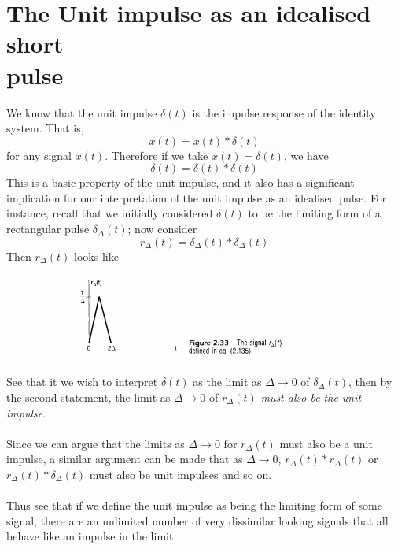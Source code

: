 \documentclass{report}
\begin{document}
\section{The Unit impulse as an idealised short\\pulse}
We know that the unit impulse $\delta(t)$ is the impulse response of the identity system. That is,
\begin{equation*}
x(t)=x(t)*\delta(t)
\end{equation*}
for any signal $x(t)$. Therefore if we take $x(t)=\delta(t)$, we have
\begin{equation*}
\delta(t)=\delta(t)*\delta(t)
\end{equation*}
This is a basic property of the unit impulse, and it also has a significant implication for our interpretation of the unit
impulse as an idealised pulse. For instance, recall that we initially
considered $\delta(t)$ to be the limiting form of a rectangular pulse $\delta_\Delta(t)$; now consider
\begin{equation*}
r_\Delta(t)=\delta_\Delta(t)*\delta_\Delta(t)
\end{equation*}
Then $r_\Delta(t)$ looks like
\begin{center}
\includegraphics[width=10cm]{a53}
\end{center}
See that it we wish to interpret $\delta(t)$ as the limit as $\Delta\to0$ of $\delta_\Delta(t)$, then by the second statement, the
limit as $\Delta\to0$ of $r_\Delta(t)$ \textit{must also be the unit impulse}.\\
\vspace{1mm}\\
Since we can argue that the limits as $\Delta\to0$ for $r_\Delta(t)$ must also be a unit impulse, a similar argument can be made that as $\Delta\to0$, $r_\Delta(t)*r_\Delta(t)$ or 
$r_\Delta(t)*\delta_\Delta(t)$ must also be unit impulses and so on.\\
\vspace{1mm}\\
Thus see that if we define the unit impulse as being the limiting form of some signal, there are an unlimited number of very dissimilar looking signals that all behave like an impulse in the limit.\\
\end{document}
